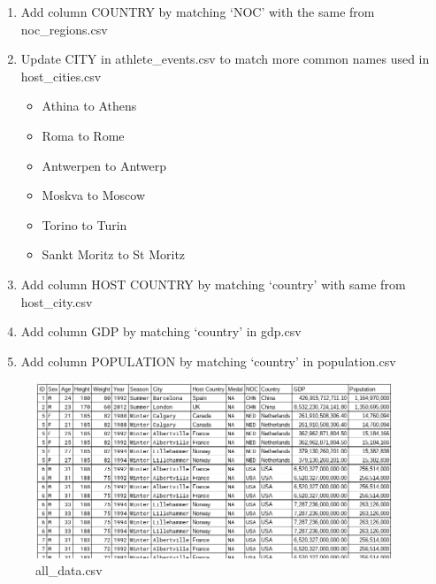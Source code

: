 \documentclass[a4 paper, 12pt]{article}
\begin{document}
\begin{enumerate}
            \item Add column COUNTRY by matching ‘NOC’ with the same from noc\_regions.csv
            \item Update CITY in athlete\_events.csv to match more common names used in host\_cities.csv
                \begin{itemize}
                    \item Athina to Athens
                    \item Roma to Rome 
                    \item Antwerpen to Antwerp
                    \item Moskva to Moscow
                    \item Torino to Turin
                    \item Sankt Moritz to St Moritz
                \end{itemize}                 
            \item Add column HOST COUNTRY by matching ‘country’ with same from host\_city.csv
            \item Add column GDP by matching ‘country’ in gdp.csv
            \item Add column POPULATION by matching ‘country’ in population.csv  
        \end{enumerate}
    
        \begin{figure} [H]
            \centering
            \includegraphics[width=0.95\textwidth, frame]
                {./images/new_data.png}     
            \caption{all\_data.csv}               
        \end{figure} 
\end{document}
